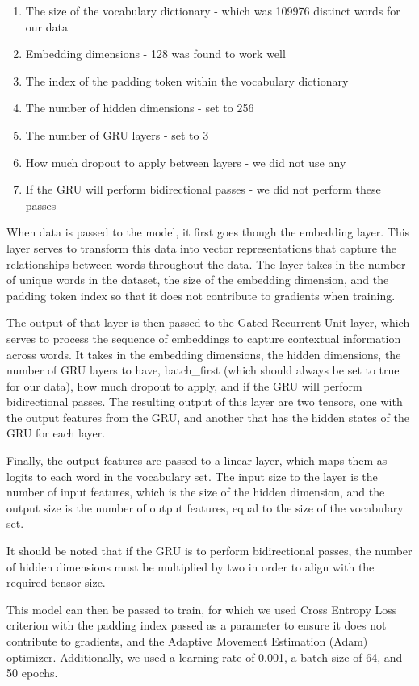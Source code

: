\documentclass{article} %
\begin{document}
\begin{enumerate}
  \item The size of the vocabulary dictionary - which was 109976 distinct words for our data
  \item Embedding dimensions - 128 was found to work well
  \item The index of the padding token within the vocabulary dictionary
  \item The number of hidden dimensions - set to 256
  \item The number of GRU layers - set to 3
  \item How much dropout to apply between layers - we did not use any
  \item If the GRU will perform bidirectional passes - we did not perform these passes
\end{enumerate}

When data is passed to the model, it first goes though the embedding layer. This layer serves to transform this data into vector representations that capture the relationships between words throughout the data. 
The layer takes in the number of unique words in the dataset, the size of the embedding dimension, and the padding token index so that it does not contribute to gradients when training.

The output of that layer is then passed to the Gated Recurrent Unit layer, which serves to
process the sequence of embeddings to capture contextual information across words. It takes in the embedding dimensions, the hidden dimensions, 
the number of GRU layers to have, batch\_first (which should always be set to true for our data),
how much dropout to apply, and if the GRU will perform bidirectional passes. The resulting output of this layer are two tensors, 
one with the output features from the GRU, and another that has the hidden states of the GRU for each layer.

Finally, the output features are passed to a linear layer, which maps them as logits to each word in the vocabulary set. The input size to the layer is the number of input features, 
which is the size of the hidden dimension, and the output size is the number of output features, equal to the size of the vocabulary set.

It should be noted that if the GRU is to perform bidirectional passes, the number of hidden dimensions must be multiplied by two in order to align with the required tensor size.

This model can then be passed to train, for which we used Cross Entropy Loss criterion with the padding index passed as a parameter to ensure it does not contribute to gradients, 
and the Adaptive Movement Estimation (Adam) optimizer. Additionally, we used a learning rate of 0.001, a batch size of 64, and 50 epochs.
\end{document}
